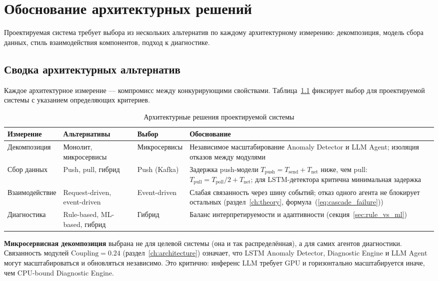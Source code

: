 \chapter{Обоснование архитектурных решений}\label{ch:comparing}

Проектируемая система требует выбора из нескольких альтернатив по каждому архитектурному измерению: декомпозиция, модель сбора данных, стиль взаимодействия компонентов, подход к диагностике.
\section{Сводка архитектурных альтернатив}

Каждое архитектурное измерение --- компромисс между конкурирующими свойствами. Таблица~\ref{tab:architecture_decisions} фиксирует выбор для проектируемой системы с указанием определяющих критериев.

\begin{table}[H]
\centering
\caption{Архитектурные решения проектируемой системы}
\label{tab:architecture_decisions}
\setlength{\tabcolsep}{2pt}\renewcommand{\arraystretch}{1.0}
\begin{tabularx}{\textwidth}{|p{3.5cm}|p{4cm}|p{3cm}|>{\raggedright\arraybackslash}X|}
\hline
\textbf{Измерение} & \textbf{Альтернативы} & \textbf{Выбор} & \textbf{Обоснование} \\
\hline
Декомпозиция & Монолит, микро\-сервисы & Микро\-сервисы & Независимое масштабирование Anomaly Detector и LLM Agent; изоляция отказов между модулями \\
\hline
Сбор данных & Push, pull, гибрид & Push (Kafka) & Задержка push-модели $T_{\text{push}} = T_{\text{send}} + T_{\text{net}}$ ниже, чем pull: $T_{\text{pull}} = T_{\text{poll}}/2 + T_{\text{net}}$; для LSTM-детектора критична минимальная задержка \\
\hline
Взаимо\-действие & Request-driven, event-driven & Event-driven & Слабая связанность через шину событий; отказ одного агента не блокирует остальных (раздел~\ref{ch:theory}, формула~(\ref{eq:cascade_failure})) \\
\hline
Диагностика & Rule-based, ML-based, гибрид & Гибрид & Баланс интерпретируемости и адаптивности (секция~\ref{sec:rule_vs_ml}) \\
\hline
\end{tabularx}
\end{table}

\textbf{Микросервисная декомпозиция} выбрана не для целевой системы (она и так распределённая), а для самих агентов диагностики. Связанность модулей $\text{Coupling} = 0.24$ (раздел~\ref{ch:architecture}) означает, что LSTM Anomaly Detector, Diagnostic Engine и LLM Agent могут масштабироваться и обновляться независимо. Это критично: инференс LLM требует GPU и горизонтально масштабируется иначе, чем CPU-bound Diagnostic Engine.

